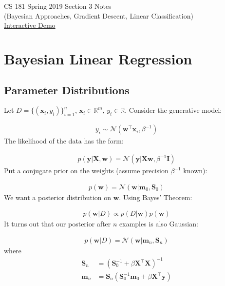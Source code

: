 \documentclass[12pt,letterpaper]{article}
\begin{document}
\begin{center}
CS 181 Spring 2019 Section 3 Notes\\
(Bayesian Approaches, Gradient Descent, Linear Classification)\\
\href{https://colab.research.google.com/drive/1AJRaGeqgTosVNWjinYPahB1RHGAOwIh-}{Interactive Demo}
\end{center}



\section{Bayesian Linear Regression}

\subsection{Parameter Distributions}

Let $D = \{(\mathbf{x}_i, y_i)\}_{i=1}^n$, $\mathbf{x}_i \in \mathbb{R}^m$, $y_i \in \mathbb{R}$. Consider the generative model:

\begin{align}
y_i \sim \mathcal{N}(\mathbf{w}^\top \mathbf{x}_i, \beta^{-1})
\end{align}
\noindent The likelihood of the data has the form:

\begin{align}
    p(\mathbf{y}|\mathbf{X},\mathbf{w}) = \mathcal{N}(\mathbf{y}|\mathbf{X}\mathbf{w},\beta^{-1}\mathbf{I})
\end{align}
\noindent Put a conjugate prior on the weights (assume precision $\beta^{-1}$ known):

\begin{align}
    p(\mathbf{w}) = \mathcal{N}(\mathbf{w}|\mathbf{m}_0, \mathbf{S}_0)
\end{align}
\noindent We want a posterior distribution on $\mathbf{w}$. Using Bayes' Theorem:

\begin{align}
    p(\mathbf{w}|D) \propto p(D|\mathbf{w})p(\mathbf{w})
\end{align}
\noindent It turns out that our posterior after $n$ examples is also Gaussian:

\begin{align}
    p(\mathbf{w}|D) = \mathcal{N}(\mathbf{w}|\mathbf{m}_n, \mathbf{S}_n)
\end{align}
where
\begin{align}
    \mathbf{S}_n &= \left(\mathbf{S}_0^{-1} + \beta \mathbf{X}^\top\mathbf{X}\right)^{-1}\\
    \mathbf{m}_n &= \mathbf{S}_n(\mathbf{S}_0^{-1}\mathbf{m}_0 + \beta \mathbf{X}^\top\mathbf{y})
\end{align}
\end{document}
